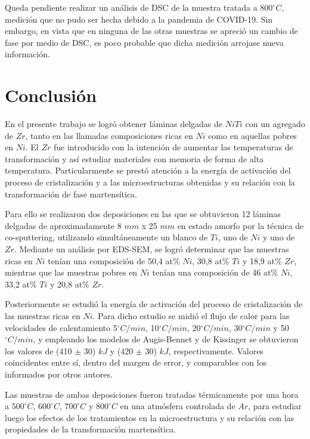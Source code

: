 \documentclass[12pt]{article}
\theoremstyle{definition}
\theoremstyle{remark}
\begin{document}
Queda pendiente realizar un análisis de DSC de la muestra tratada a $800 ^\circ C$, medición que no pudo ser hecha debido a la pandemia de COVID-19. Sin embargo, en vista que en ninguna de las otras muestras se apreció un cambio de fase por medio de DSC, es poco probable que dicha medición arrojase nueva información.

\newpage
\section{Conclusión}
En el presente trabajo se logró obtener láminas delgadas de $NiTi$ con un agregado de $Zr$, tanto en las llamadas composiciones ricas en $Ni$ como en aquellas pobres en $Ni$. El $Zr$ fue introducido con la intención de aumentar las temperaturas de transformación y así estudiar materiales con memoria de forma de alta temperatura. Particularmente se prestó atención a la energía de activación del proceso de cristalización y a las microestructuras obtenidas y su relación con la transformación de fase martensítica. 

Para ello se realizaron dos deposiciones en las que se obtuvieron 12 láminas delgadas de aproximadamente 8 $mm$ x 25 $mm$ en estado amorfo por la técnica de co-sputtering, utilizando simultáneamente un blanco de $Ti$, uno de $Ni$ y uno de $Zr$. Mediante un análisis por EDS-SEM, se logró determinar que las muestras ricas en $Ni$ tenían una composición de 50,4 at\% $Ni$, 30,8 at\% $Ti$ y 18,9 at\% $Zr$, mientras que las muestras pobres en $Ni$ tenían una composición de 46 at\% $Ni$, 33,2 at\% $Ti$ y 20,8 at\% $Zr$.

Posteriormente se estudió la energía de activación del proceso de cristalización de las muestras ricas en $Ni$. Para dicho estudio se midió el flujo de calor para las velocidades de calentamiento 5$^\circ C/min$, 10$^\circ C/min$, 20$^\circ C/min$, 30$^\circ C/min$ y 50$^\circ C/min$, y empleando los modelos de Augis-Bennet y de Kissinger se obtuvieron los valores de (410 $\pm$ 30) $kJ$ y (420 $\pm$ 30) $kJ$, respectivamente. Valores coincidentes entre sí, dentro del margen de error, y comparables con los informados por otros autores.

Las muestras de ambas deposiciones fueron tratadas térmicamente por una hora a $500^\circ C$, $600^\circ C$, $700^\circ C$ y $800^\circ C$ en una atmósfera controlada de $Ar$, para estudiar luego los efectos de los tratamientos en la microestructura y su relación con las propiedades de la transformación martensítica.
\end{document}
